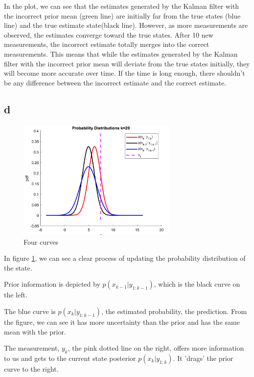 In the plot, we can see that the estimates generated by the Kalman filter with the incorrect prior mean (green line) are initially far from the true states (blue line) and the true estimate state(black line). However, as more measurements are observed, the estimates converge toward the true states. After 10 new measurements, the incorrect estimate totally merges into the correct measurements. This means that while the estimates generated by the Kalman filter with the incorrect prior mean will deviate from the true states initially, they will become more accurate over time. If the time is long enough, there shouldn't be any difference between the incorrect estimate and the correct estimate.

\subsection{d}

\begin{figure}[H]
 \centering
 \includegraphics[width=0.7\textwidth]{images/steps.png}
 \caption{Four curves}
 \label{1d}
\end{figure}

In figure \ref{1d}, we can see a clear process of updating the probability distribution of the state.

Prior information is depicted by $p(x_{k-1}\big|y_{1:k-1})$, which is the black curve on the left.

The blue curve is $p(x_k\big|y_{1:k-1})$, the estimated probability, the prediction. From the figure, we can see it has more uncertainty than the prior and has the same mean with the prior.

The measurement, $ y_k $, the pink dotted line on the right, offers more information to us and gets to the current state posterior $p(x_k\big|y_{1:k})$. It 'drags' the prior curve to the right.

